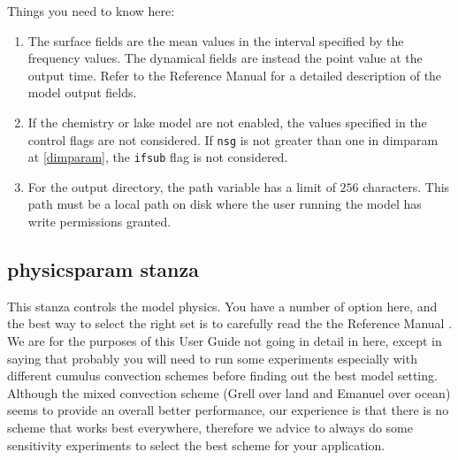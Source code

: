Things you need to know here:

\begin{enumerate}
\item The surface fields are the mean values in the interval specified by
the frequency values. The dynamical fields are instead the point value at the
output time. Refer to the Reference Manual \cite{refman_11} for a detailed
description of the model output fields.
\item If the chemistry or lake model are not enabled, the values specified in
the control flags are not considered. If \verb=nsg= is not greater than one
in dimparam at \ref{dimparam}, the \verb=ifsub= flag is not considered.
\item For the output directory, the path variable has a limit of $256$
characters. This path must be a local path on disk where the user running
the model has write permissions granted.
\end{enumerate}

\subsection{physicsparam stanza}
\label{physicsparam}

This stanza controls the model physics. You have a number of option here,
and the best way to select the right set is to carefully read the the
Reference Manual \cite{refman_11}. We are for the purposes of this User Guide
not going in detail in here, except in saying that probably you will need
to run some experiments especially with different cumulus convection
schemes before finding out the best model setting.
Although the mixed convection scheme (Grell over land and Emanuel over ocean)
seems to provide an overall better performance, our experience is that there
is no scheme that works best everywhere, therefore we advice to always do some
sensitivity experiments to select the best scheme for your application.

